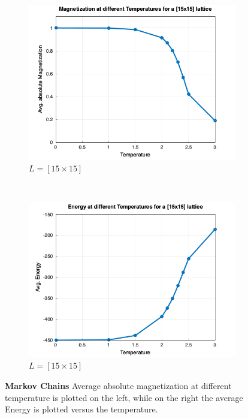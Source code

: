 \begin{figure}[t]
\begin{subfigure}{0.5\textwidth}
		\includegraphics[width=\textwidth]{./img/avg_mag_15.png}
		\caption{$L=[15\times15]$}
		\label{sfig:sublabel5}
	\end{subfigure}%
	~
	\begin{subfigure}{0.5\textwidth}
		\includegraphics[width=\textwidth]{./img/avg_en_15.png}
		\caption{$L=[15\times15]$}
		\label{sfig:sublabel6}
	\end{subfigure}

	\caption{\textbf{Markov Chains}
		Average absolute magnetization at different temperature is plotted on the left, while on the right the average Energy is plotted versus the temperature.
	}
	\label{fig:avg_em}
\end{figure}
